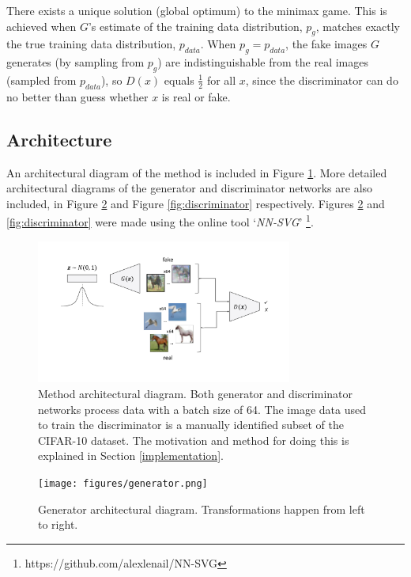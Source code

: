 \documentclass{article}
\begin{document}
There exists a unique solution (global optimum) to the minimax game. This is achieved when $G$'s estimate of the training data distribution, $p_g$, matches exactly the true training data distribution, $p_{data}$. When $p_g = p_{data}$, the fake images $G$ generates (by sampling from $p_g$) are indistinguishable from the real images (sampled from $p_{data}$), so $D(x)$ equals $\frac{1}{2}$ for all $x$, since the discriminator can do no better than guess whether $x$ is real or fake.

\subsection{Architecture}
An architectural diagram of the method is included in Figure \ref{fig:architecture}. More detailed architectural diagrams of the generator and discriminator networks are also included, in Figure \ref{fig:generator} and Figure \ref{fig:discriminator} respectively. Figures \ref{fig:generator} and \ref{fig:discriminator} were made using the online tool `\textit{NN-SVG}' \footnote{https://github.com/alexlenail/NN-SVG}.

\begin{figure}[h]
    \begin{center}
        \includegraphics[width=0.75\textwidth]{figures/architecture.pdf}
    \end{center}
    \caption{Method architectural diagram. Both generator and discriminator networks process data with a batch size of 64. The image data used to train the discriminator is a manually identified subset of the CIFAR-10 dataset. The motivation and method for doing this is explained in Section \ref{implementation}.}
    \label{fig:architecture}
\end{figure}

\begin{figure}[h]
    \begin{center}
        \texttt{[image: figures/generator.png]}
    \end{center}
    \caption{Generator architectural diagram. Transformations happen from left to right.}
    \label{fig:generator}
\end{figure}
\end{document}
